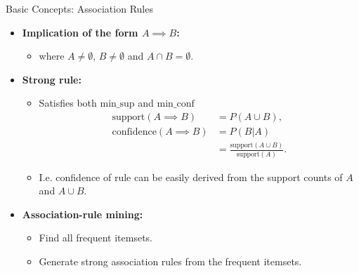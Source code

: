 \begin{frame}{Basic Concepts: Association Rules}
	\begin{itemize}
		\item \textbf{Implication of the form $A \implies B$:}
		      \begin{itemize}
			      \item where $A \neq \emptyset$, $B \neq \emptyset$ and $A \cap B =
				            \emptyset$.
		      \end{itemize}
		\item \textbf{Strong rule:}
		      \begin{itemize}
			      \item Satisfies both $\text{min\_sup}$ and $\text{min\_conf}$
			            \begin{align*}
				            \text{support}(A \implies B)    & = P(A \cup B),                                        \\
				            \text{confidence}(A \implies B) & = P(B | A)                                            \\
				                                            & = \frac{\text{support}(A \cup B)}{\text{support}(A)}.
			            \end{align*}
			      \item I.e. confidence of rule can be easily derived from the
			            support counts of $A$ and $A \cup B$.
		      \end{itemize}
		\item \textbf{Association-rule mining:}
		      \begin{itemize}
			      \item Find all frequent itemsets.
			      \item Generate strong association rules from the frequent itemsets.
		      \end{itemize}
	\end{itemize}
\end{frame}

